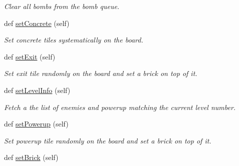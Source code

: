 \begin{DoxyCompactItemize}
\begin{DoxyCompactList}\small\item\em Clear all bombs from the bomb queue. \end{DoxyCompactList}\item 
\hypertarget{classsrc_1_1level_1_1_level_ad43e3dab276d7ea38b268f22827b0236}{}def \hyperlink{classsrc_1_1level_1_1_level_ad43e3dab276d7ea38b268f22827b0236}{set\+Concrete} (self)\label{classsrc_1_1level_1_1_level_ad43e3dab276d7ea38b268f22827b0236}

\begin{DoxyCompactList}\small\item\em Set concrete tiles systematically on the board. \end{DoxyCompactList}\item 
\hypertarget{classsrc_1_1level_1_1_level_a37d135e2fd7961eb5f2921447d1c8243}{}def \hyperlink{classsrc_1_1level_1_1_level_a37d135e2fd7961eb5f2921447d1c8243}{set\+Exit} (self)\label{classsrc_1_1level_1_1_level_a37d135e2fd7961eb5f2921447d1c8243}

\begin{DoxyCompactList}\small\item\em Set exit tile randomly on the board and set a brick on top of it. \end{DoxyCompactList}\item 
\hypertarget{classsrc_1_1level_1_1_level_a6e5e52649e074784152f5fe8f94ded08}{}def \hyperlink{classsrc_1_1level_1_1_level_a6e5e52649e074784152f5fe8f94ded08}{set\+Level\+Info} (self)\label{classsrc_1_1level_1_1_level_a6e5e52649e074784152f5fe8f94ded08}

\begin{DoxyCompactList}\small\item\em Fetch a the list of enemies and powerup matching the current level number. \end{DoxyCompactList}\item 
\hypertarget{classsrc_1_1level_1_1_level_a7ab32312eb682ecce07ae83551c051e1}{}def \hyperlink{classsrc_1_1level_1_1_level_a7ab32312eb682ecce07ae83551c051e1}{set\+Powerup} (self)\label{classsrc_1_1level_1_1_level_a7ab32312eb682ecce07ae83551c051e1}

\begin{DoxyCompactList}\small\item\em Set powerup tile randomly on the board and set a brick on top of it. \end{DoxyCompactList}\item 
\hypertarget{classsrc_1_1level_1_1_level_ae430589f114a19e13c2667e8ef37e266}{}def \hyperlink{classsrc_1_1level_1_1_level_ae430589f114a19e13c2667e8ef37e266}{set\+Brick} (self)\label{classsrc_1_1level_1_1_level_ae430589f114a19e13c2667e8ef37e266}


\end{DoxyCompactItemize}
